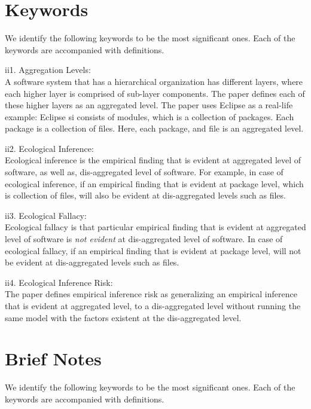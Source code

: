 \documentclass[12pt]{article}
\begin{document}
\section{Keywords}
\label{keywords}
We identify the following keywords to be the most significant ones.  Each of the keywords 
are accompanied with definitions. 

\begin{itemize}
\begin{item}
ii1. Aggregation Levels: \\
A software system that has a hierarchical organization has different layers, where
each higher layer is comprised of sub-layer components.  The paper defines 
each of these higher layers as an aggregated level. The paper uses Eclipse as a real-life
example: Eclipse si consists of modules, which is a collection of packages. Each package 
is a collection of files. Here, each package, and file is an aggregated level.   
\end{item}
\begin{item}
ii2. Ecological Inference: \\
Ecological inference is the empirical finding that is evident at aggregated level of 
software, as well as, dis-aggregated level of software. For example, in case of ecological inference, if an empirical finding that is evident at package level, which is collection of
files, will also be evident at dis-aggregated levels such as files. 
\end{item}
\begin{item}
ii3. Ecological Fallacy: \\
Ecological fallacy is that particular empirical finding that is evident at aggregated level of software is \textit{not evident} at dis-aggregated level of software. In case of ecological fallacy, if an empirical finding that is evident at package level, will not be evident at dis-aggregated levels such as files. 
\end{item}
\begin{item}
ii4. Ecological Inference Risk: \\
The paper defines empirical inference risk as generalizing an empirical inference that is 
evident at aggregated level, to a dis-aggregated level without running 
the same model with the factors existent at the dis-aggregated level. 
\end{item}
\end{itemize} 

\section{Brief Notes}
\label{brief}
We identify the following keywords to be the most significant ones.  Each of the keywords 
are accompanied with definitions. 
\end{document}
